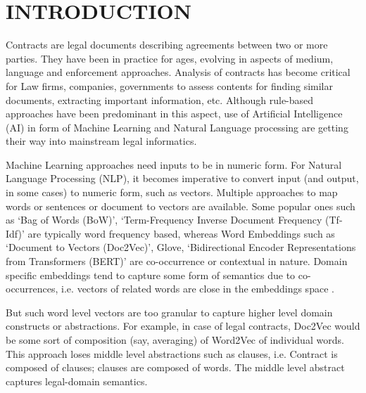 \documentclass[journal]{journal}
\begin{document}
%




\section{INTRODUCTION}

Contracts are legal documents describing agreements between two or more parties. They have been in practice for ages, evolving in aspects of medium, language and enforcement approaches. Analysis of contracts has become critical for Law firms, companies, governments to assess contents for finding similar documents, extracting important information, etc. Although rule-based approaches have been predominant in this aspect, use of Artificial Intelligence (AI) in form of Machine Learning and Natural Language processing are getting their way into mainstream legal informatics.

Machine Learning approaches need inputs to be in numeric form. For Natural Language Processing (NLP), it becomes imperative to convert input (and output, in some cases) to numeric form, such as vectors. Multiple approaches to map words or sentences or document to vectors are available. Some popular ones such as `Bag of Words (BoW)', `Term-Frequency Inverse Document Frequency (Tf-Idf)' are typically word frequency based, whereas Word Embeddings such as `Document to Vectors (Doc2Vec)', Glove, `Bidirectional Encoder Representations from Transformers (BERT)' are co-occurrence or contextual in nature. Domain specific embeddings tend to capture some form of semantics due to co-occurrences, i.e. vectors of related words are close in the embeddings space \cite{Doc2VecSurvey}.

But such word level vectors are too granular to capture higher level domain constructs or abstractions. For example, in case of legal contracts, Doc2Vec would be some sort of composition (say, averaging) of Word2Vec of individual words. This approach loses middle level abstractions such as clauses, i.e. Contract is composed of clauses; clauses are composed of words. The middle level abstract captures legal-domain semantics.
\end{document}

